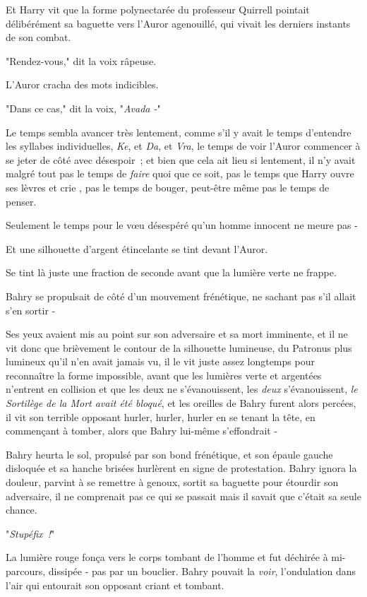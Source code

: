 Et Harry vit que la forme polynectarée du professeur Quirrell pointait délibérément sa baguette vers l'Auror agenouillé, qui vivait les derniers instants de son combat.

"Rendez-vous," dit la voix râpeuse.

L'Auror cracha des mots indicibles.

"Dans ce cas," dit la voix, "\emph{Avada -}"

Le temps sembla avancer très lentement, comme s'il y avait le temps d'entendre les syllabes individuelles, \emph{Ke}, et \emph{Da}, et \emph{Vra}, le temps de voir l'Auror commencer à se jeter de côté avec désespoir~; et bien que cela ait lieu si lentement, il n'y avait malgré tout pas le temps de \emph{faire} quoi que ce soit, pas le temps que Harry ouvre ses lèvres et crie , pas le temps de bouger, peut-être même pas le temps de penser.

Seulement le temps pour le vœu désespéré qu'un homme innocent ne meure pas -

Et une silhouette d'argent étincelante se tint devant l'Auror.

Se tint là juste une fraction de seconde avant que la lumière verte ne frappe.

\later

Bahry se propulsait de côté d'un mouvement frénétique, ne sachant pas s'il allait s'en sortir -

Ses yeux avaient mis au point sur son adversaire et sa mort imminente, et il ne vit donc que brièvement le contour de la silhouette lumineuse, du Patronus plus lumineux qu'il n'en avait jamais vu, il le vit juste assez longtemps pour reconnaître la forme impossible, avant que les lumières verte et argentées n'entrent en collision et que les deux ne s'évanouissent, les \emph{deux} s'évanouissent, \emph{le Sortilège de la Mort avait été bloqué}, et les oreilles de Bahry furent alors percées, il vit son terrible opposant hurler, hurler, hurler en se tenant la tête, en commençant à tomber, alors que Bahry lui-même s'effondrait -

Bahry heurta le sol, propulsé par son bond frénétique, et son épaule gauche disloquée et sa hanche brisées hurlèrent en signe de protestation. Bahry ignora la douleur, parvint à se remettre à genoux, sortit sa baguette pour étourdir son adversaire, il ne comprenait pas ce qui se passait mais il savait que c'était sa seule chance.

"\emph{Stupéfix~!}"

La lumière rouge fonça vers le corps tombant de l'homme et fut déchirée à mi-parcours, dissipée - pas par un bouclier. Bahry pouvait la \emph{voir}, l'ondulation dans l'air qui entourait son opposant criant et tombant.

